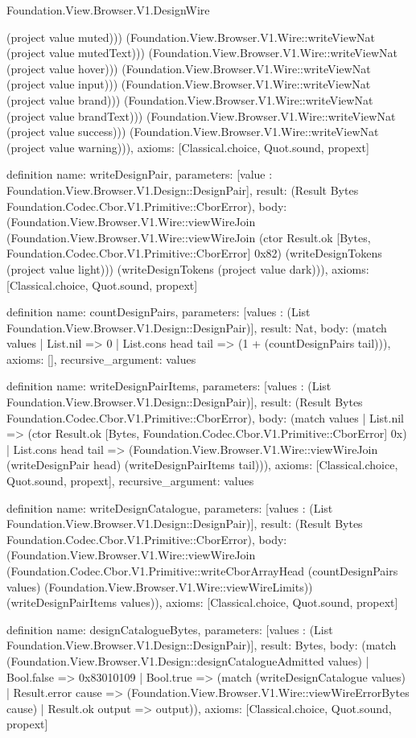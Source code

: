 \begin{lexlean}{Foundation.View.Browser.V1.DesignWire}
\begin{semanticmodule}
{(project value muted))) (Foundation.View.Browser.V1.Wire::writeViewNat (project value mutedText))) (Foundation.View.Browser.V1.Wire::writeViewNat (project value hover))) (Foundation.View.Browser.V1.Wire::writeViewNat (project value input))) (Foundation.View.Browser.V1.Wire::writeViewNat (project value brand))) (Foundation.View.Browser.V1.Wire::writeViewNat (project value brandText))) (Foundation.View.Browser.V1.Wire::writeViewNat (project value success))) (Foundation.View.Browser.V1.Wire::writeViewNat (project value warning))),
  axioms: [Classical.choice, Quot.sound, propext]
}

definition{
  name: writeDesignPair,
  parameters: [value : Foundation.View.Browser.V1.Design::DesignPair],
  result: (Result Bytes Foundation.Codec.Cbor.V1.Primitive::CborError),
  body: (Foundation.View.Browser.V1.Wire::viewWireJoin (Foundation.View.Browser.V1.Wire::viewWireJoin (ctor Result.ok [Bytes, Foundation.Codec.Cbor.V1.Primitive::CborError] 0x82) (writeDesignTokens (project value light))) (writeDesignTokens (project value dark))),
  axioms: [Classical.choice, Quot.sound, propext]
}

definition{
  name: countDesignPairs,
  parameters: [values : (List Foundation.View.Browser.V1.Design::DesignPair)],
  result: Nat,
  body: (match values | List.nil => 0 | List.cons head tail => (1 + (countDesignPairs tail))),
  axioms: [],
  recursive_argument: values
}

definition{
  name: writeDesignPairItems,
  parameters: [values : (List Foundation.View.Browser.V1.Design::DesignPair)],
  result: (Result Bytes Foundation.Codec.Cbor.V1.Primitive::CborError),
  body: (match values
    | List.nil => (ctor Result.ok [Bytes, Foundation.Codec.Cbor.V1.Primitive::CborError] 0x)
    | List.cons head tail => (Foundation.View.Browser.V1.Wire::viewWireJoin (writeDesignPair head) (writeDesignPairItems tail))),
  axioms: [Classical.choice, Quot.sound, propext],
  recursive_argument: values
}

definition{
  name: writeDesignCatalogue,
  parameters: [values : (List Foundation.View.Browser.V1.Design::DesignPair)],
  result: (Result Bytes Foundation.Codec.Cbor.V1.Primitive::CborError),
  body: (Foundation.View.Browser.V1.Wire::viewWireJoin (Foundation.Codec.Cbor.V1.Primitive::writeCborArrayHead (countDesignPairs values) (Foundation.View.Browser.V1.Wire::viewWireLimits)) (writeDesignPairItems values)),
  axioms: [Classical.choice, Quot.sound, propext]
}

definition{
  name: designCatalogueBytes,
  parameters: [values : (List Foundation.View.Browser.V1.Design::DesignPair)],
  result: Bytes,
  body: (match (Foundation.View.Browser.V1.Design::designCatalogueAdmitted values)
    | Bool.false => 0x83010109
    | Bool.true => (match (writeDesignCatalogue values)
      | Result.error cause => (Foundation.View.Browser.V1.Wire::viewWireErrorBytes cause)
      | Result.ok output => output)),
  axioms: [Classical.choice, Quot.sound, propext]
}
\end{semanticmodule}
\end{lexlean}
